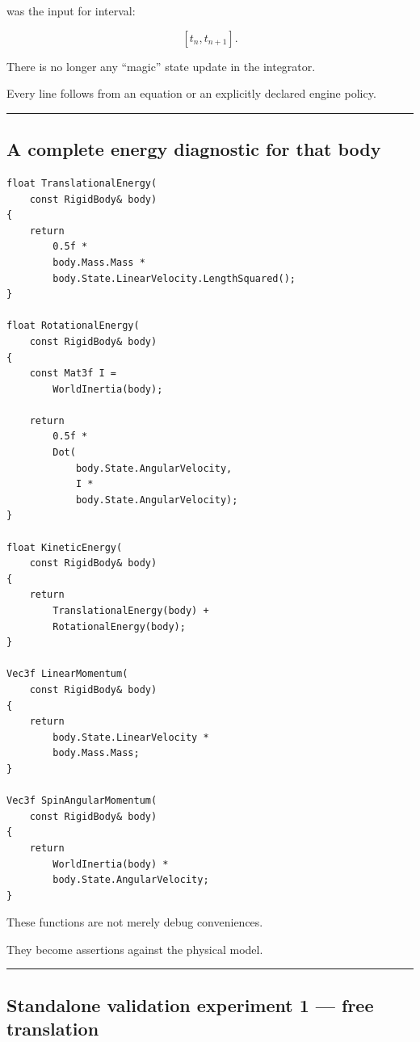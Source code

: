 was the input for interval:

\[
[t_n,t_{n+1}].
\]

There is no longer any ``magic'' state update in the integrator.

Every line follows from an equation or an explicitly declared engine policy.

\begin{center}\rule{0.5\linewidth}{0.5pt}\end{center}

\subsection{A complete energy diagnostic for that body}\label{06-engine-ii-ch039-a-complete-energy-diagnostic-for-that-body}

\begin{verbatim}
float TranslationalEnergy(
    const RigidBody& body)
{
    return
        0.5f *
        body.Mass.Mass *
        body.State.LinearVelocity.LengthSquared();
}

float RotationalEnergy(
    const RigidBody& body)
{
    const Mat3f I =
        WorldInertia(body);

    return
        0.5f *
        Dot(
            body.State.AngularVelocity,
            I *
            body.State.AngularVelocity);
}

float KineticEnergy(
    const RigidBody& body)
{
    return
        TranslationalEnergy(body) +
        RotationalEnergy(body);
}

Vec3f LinearMomentum(
    const RigidBody& body)
{
    return
        body.State.LinearVelocity *
        body.Mass.Mass;
}

Vec3f SpinAngularMomentum(
    const RigidBody& body)
{
    return
        WorldInertia(body) *
        body.State.AngularVelocity;
}
\end{verbatim}

These functions are not merely debug conveniences.

They become assertions against the physical model.

\begin{center}\rule{0.5\linewidth}{0.5pt}\end{center}

\subsection{Standalone validation experiment 1 --- free translation}\label{06-engine-ii-ch039-standalone-validation-experiment-1-free-translation}

